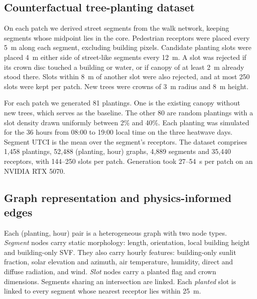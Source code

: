 \documentclass[preprint,12pt,authoryear]{elsarticle}
\begin{document}
\subsection{Counterfactual tree-planting dataset}\label{sec:dataset}

On each patch we derived street segments from the walk network, keeping segments whose midpoint lies in the core. Pedestrian receptors were placed every 5~m along each segment, excluding building pixels. Candidate planting slots were placed 4~m either side of street-like segments every 12~m. A slot was rejected if its crown disc touched a building or water, or if canopy of at least 2~m already stood there. Slots within 8~m of another slot were also rejected, and at most 250 slots were kept per patch. New trees were crowns of 3~m radius and 8~m height.

For each patch we generated 81 plantings. One is the existing canopy without new trees, which serves as the baseline. The other 80 are random plantings with a slot density drawn uniformly between 2\% and 40\%. Each planting was simulated for the 36 hours from 08:00 to 19:00 local time on the three heatwave days. Segment UTCI is the mean over the segment's receptors. The dataset comprises 1,458 plantings, 52,488 (planting, hour) graphs, 4,889 segments and 35,440 receptors, with 144--250 slots per patch. Generation took 27--54~s per patch on an NVIDIA RTX 5070.

\subsection{Graph representation and physics-informed edges}\label{sec:graph}

Each (planting, hour) pair is a heterogeneous graph with two node types. \emph{Segment} nodes carry static morphology: length, orientation, local building height and building-only SVF. They also carry hourly features: building-only sunlit fraction, solar elevation and azimuth, air temperature, humidity, direct and diffuse radiation, and wind. \emph{Slot} nodes carry a planted flag and crown dimensions. Segments sharing an intersection are linked. Each \emph{planted} slot is linked to every segment whose nearest receptor lies within 25~m.
\end{document}
